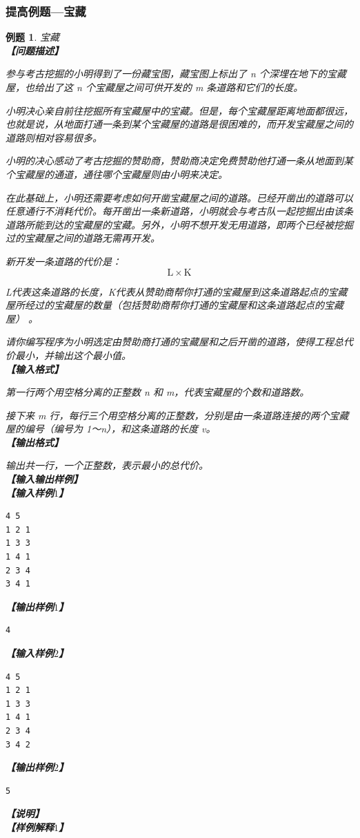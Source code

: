 \documentclass{article}
\newtheorem{example}{例题}[subsection]
\theoremstyle{nonumberplain}
\begin{document}
\subsubsection{提高例题---宝藏}
\begin{example}宝藏\\
	\textbf{【问题描述】}

	参与考古挖掘的小明得到了一份藏宝图，藏宝图上标出了 n 个深埋在地下的宝藏屋，也给出了这 n 个宝藏屋之间可供开发的 m 条道路和它们的长度。

	小明决心亲自前往挖掘所有宝藏屋中的宝藏。但是，每个宝藏屋距离地面都很远， 也就是说，从地面打通一条到某个宝藏屋的道路是很困难的，而开发宝藏屋之间的道路则相对容易很多。

	小明的决心感动了考古挖掘的赞助商，赞助商决定免费赞助他打通一条从地面到某个宝藏屋的通道，通往哪个宝藏屋则由小明来决定。

	在此基础上，小明还需要考虑如何开凿宝藏屋之间的道路。已经开凿出的道路可以任意通行不消耗代价。每开凿出一条新道路，小明就会与考古队一起挖掘出由该条道路所能到达的宝藏屋的宝藏。另外，小明不想开发无用道路，即两个已经被挖掘过的宝藏屋之间的道路无需再开发。

	新开发一条道路的代价是：
	\begin{equation*}\mathrm{L} \times \mathrm{K}\end{equation*}

	L代表这条道路的长度，K代表从赞助商帮你打通的宝藏屋到这条道路起点的宝藏屋所经过的宝藏屋的数量（包括赞助商帮你打通的宝藏屋和这条道路起点的宝藏屋） 。

	请你编写程序为小明选定由赞助商打通的宝藏屋和之后开凿的道路，使得工程总代价最小，并输出这个最小值。
	\\
	\textbf{【输入格式】}

	第一行两个用空格分离的正整数 n 和 m，代表宝藏屋的个数和道路数。

	接下来 m 行，每行三个用空格分离的正整数，分别是由一条道路连接的两个宝藏屋的编号（编号为 1～n），和这条道路的长度 v。
	\ \\
	\textbf{【输出格式】}

	输出共一行，一个正整数，表示最小的总代价。
	\\
	\textbf{【输入输出样例】}
	\ \\
	\textbf{【输入样例$1$】}
	\begin{verbatim}
4 5 
1 2 1 
1 3 3 
1 4 1 
2 3 4 
3 4 1 
\end{verbatim}
	\textbf{【输出样例$1$】}
	\begin{verbatim}
4
\end{verbatim}
	\textbf{【输入样例$2$】}
	\begin{verbatim}
4 5 
1 2 1 
1 3 3 
1 4 1 
2 3 4 
3 4 2  
\end{verbatim}
	\textbf{【输出样例$2$】}
	\begin{verbatim}
5
\end{verbatim}
	\textbf{【说明】}
	\ \\
	\textbf{【样例解释$1$】}


\end{example}
\end{document}

